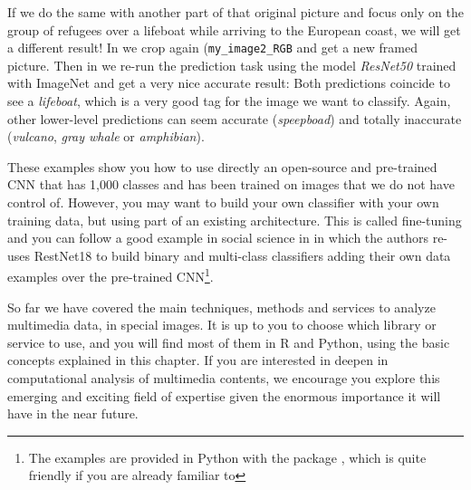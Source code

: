 If we do the same with another part of that original picture and focus only on the  group of refugees over a lifeboat while arriving to the European coast, we will get a different result! In  we crop again (\texttt{my\_image2\_RGB} and get a new framed picture. Then in  we re-run the prediction task using the model \textit{ResNet50} trained with ImageNet and get a very nice accurate result: Both predictions coincide to see a \textit{lifeboat}, which is a very good tag for the image we want to classify. Again, other lower-level predictions can seem accurate (\textit{speepboad}) and totally inaccurate (\textit{vulcano}, \textit{gray whale} or \textit{amphibian}).



These examples show you how to use directly an open-source and pre-trained CNN that has 1,000 classes and has been trained on images that we do not have control of. However, you may want to build your own classifier with your own training data, but using part of an existing architecture. This is called fine-tuning and you can follow a good example in social science in \citet{williams2020images} in which the authors re-uses RestNet18 to build binary and multi-class classifiers adding their own data examples over the pre-trained CNN\footnote{The examples are provided in Python with the package , which is quite friendly if you are already familiar to  }. 

So far we have covered the main techniques, methods and services to analyze multimedia data, in special images. It is up to you to choose which library or service to use, and you will find most of them in R and Python, using the basic concepts explained in this chapter. If you are interested in deepen in computational analysis of multimedia contents, we encourage you explore this emerging and exciting field of expertise given the enormous importance it will have in the near future. 
